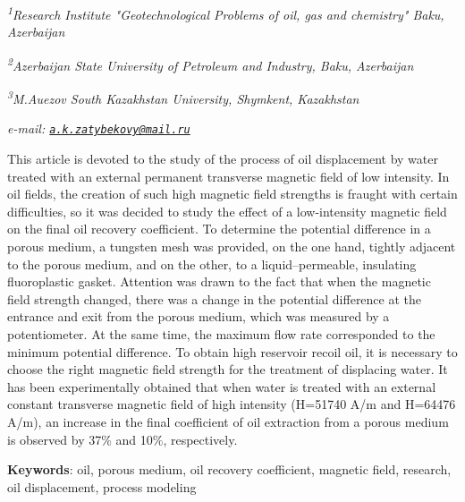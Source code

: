 \begin{affiliation}
\emph{\textsuperscript{1}Research Institute "Geotechnological Problems of oil, gas and chemistry" Baku, Azerbaijan}

\emph{\textsuperscript{2}Azerbaijan State University of Petroleum and Industry, Baku, Azerbaijan}

\emph{\textsuperscript{3}M.Auezov South Kazakhstan University, Shymkent, Kazakhstan}

\emph{e-mail: \href{mailto:a.k.zatybekovy@mail.ru}{\nolinkurl{a.k.zatybekovy@mail.ru}}}
\end{affiliation}

This article is devoted to the study of the process of oil displacement
by water treated with an external permanent transverse magnetic field of
low intensity. In oil fields, the creation of such high magnetic field
strengths is fraught with certain difficulties, so it was decided to
study the effect of a low-intensity magnetic field on the final oil
recovery coefficient. To determine the potential difference in a porous
medium, a tungsten mesh was provided, on the one hand, tightly adjacent
to the porous medium, and on the other, to a liquid--permeable,
insulating fluoroplastic gasket. Attention was drawn to the fact that
when the magnetic field strength changed, there was a change in the
potential difference at the entrance and exit from the porous medium,
which was measured by a potentiometer. At the same time, the maximum
flow rate corresponded to the minimum potential difference. To obtain
high reservoir recoil oil, it is necessary to choose the right magnetic
field strength for the treatment of displacing water. It has been
experimentally obtained that when water is treated with an external
constant transverse magnetic field of high intensity (H=51740 A/m and
H=64476 A/m), an increase in the final coefficient of oil extraction
from a porous medium is observed by 37\% and 10\%, respectively.

{\bfseries Keywords}: oil, porous medium, oil recovery coefficient,
magnetic field, research, oil displacement, process modeling

